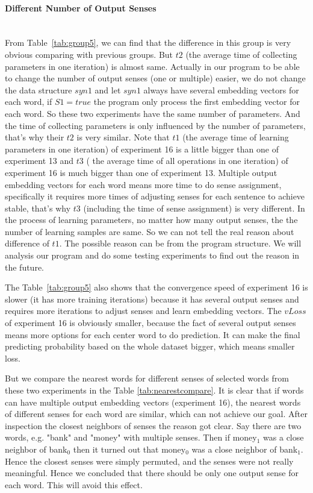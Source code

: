 \paragraph{Different Number of Output Senses}  \ \\
From Table~\ref{tab:group5}, we can find that the difference in this group is very obvious comparing with previous groups. But $t2$ (the average time of collecting parameters in one iteration) is almost same. Actually in our program to be able to change the  number of output senses (one or multiple) easier, we do not change the data structure $syn1$ and let $syn1$ always have several embedding vectors for each word, if $S1=true$ the program only process the first embedding vector for each word. So these two experiments have the same number of parameters. And the time of collecting parameters is only influenced by the number of parameters, that's why their $t2$ is very similar. Note that $t1$ (the average time of learning parameters in one iteration) of experiment 16 is a little bigger than one of experiment 13  and $t3$ ( the average time of all operations in one iteration) of experiment 16 is much bigger than one of experiment 13. Multiple output embedding vectors for each word means more time to do sense assignment, specifically it requires more times of adjusting senses for each sentence to achieve stable, that's why $t3$ (including the time of sense assignment) is very different. In the process of learning parameters, no matter how many output senses, the the number of learning samples are same. So we can not tell the real reason about difference of $t1$. The possible reason can be from the program structure. We will analysis our program and do some testing experiments to find out the reason in the future. 

The Table~\ref{tab:group5} also shows that the convergence speed of experiment 16 is slower (it has more training iterations) because it has several output senses and requires more iterations to adjust senses and learn embedding vectors. The $vLoss$ of experiment 16 is obviously smaller, because the fact of several output senses means more options for each center word to do prediction. It can make the final predicting probability based on the whole dataset bigger, which means smaller loss.  

But we compare the nearest words for different senses of selected words from these two experiments in the Table \ref{tab:nearestcompare}. It is clear that if words can have multiple output embedding vectors (experiment 16), the nearest words of different senses for each word are similar, which can not achieve our goal.  After inspection the closest neighbors of senses the reason got clear. Say there are two words, e.g. "bank" and "money" with multiple senses. Then if money$_1$ was a close neighbor of bank$_0$ then it turned out that money$_0$ was a close neighbor of bank$_1$. Hence the closest senses were simply permuted, and the senses were not really meaningful. Hence we concluded that there should be only one output sense for each word. This will avoid this effect. 

